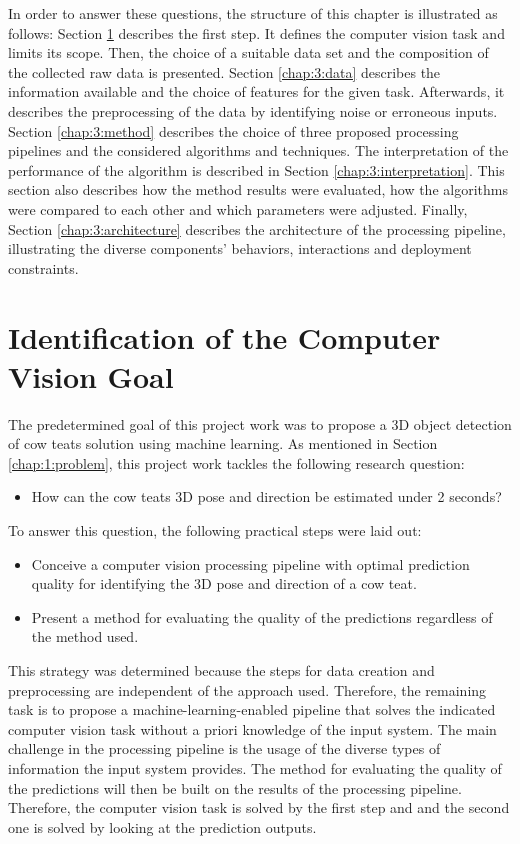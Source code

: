 In order to answer these questions, the structure of this chapter is illustrated as follows: Section \ref{chap:3:goal} describes the first step. It defines the computer vision task and limits its scope. Then, the choice of a suitable data set and the composition of the collected raw data is presented. Section \ref{chap:3:data} describes the information available and the choice of features for the given task. Afterwards, it describes the preprocessing of the data by identifying noise or erroneous inputs. Section \ref{chap:3:method} describes the choice of three proposed processing pipelines and the considered algorithms and techniques.  The interpretation of the performance of the algorithm is described in Section \ref{chap:3:interpretation}. This section also describes how the method results were evaluated, how the algorithms were compared to each other and which parameters were adjusted. Finally, Section \ref{chap:3:architecture} describes the architecture of the processing pipeline, illustrating the diverse components' behaviors, interactions and deployment constraints.

%  
\section{Identification of the Computer Vision Goal}\label{chap:3:goal}
The predetermined goal of this project work was to propose a 3D object detection of cow teats solution using machine learning. As mentioned in Section \ref{chap:1:problem}, this project work tackles the following research question: 
\begin{itemize}
    \item How can the cow teats 3D pose and direction be estimated under 2 seconds?
\end{itemize}
To answer this question, the following practical steps were laid out:
\begin{itemize}
    \item Conceive a computer vision processing pipeline with optimal prediction quality for identifying the 3D pose and direction of a cow teat.
    \item Present a method for evaluating the quality of the predictions regardless of the method used.
\end{itemize}
This strategy was determined because the steps for data creation and preprocessing are independent of the approach used. Therefore, the remaining task is to propose a machine-learning-enabled pipeline that solves the indicated computer vision task without a priori knowledge of the input system. The main challenge in the processing pipeline is the usage of the diverse types of information the input system provides. The method for evaluating the quality of the predictions will then be built on the results of the processing pipeline. Therefore, the computer vision task is solved by the first step and and the second one is solved by looking at the prediction outputs.

